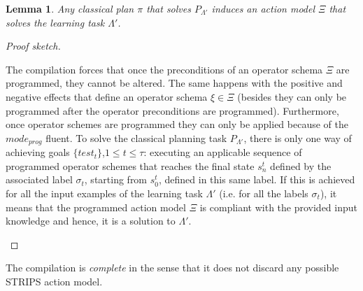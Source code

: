 \documentclass[letterpaper]{article} %
\newtheorem{lemma}[theorem]{Lemma}
\begin{document}
\begin{lemma}
Any classical plan $\pi$ that solves $P_{\Lambda'}$ induces an action model $\Xi$ that solves the learning task $\Lambda'$.
\end{lemma}

\begin{proof}[Proof sketch]
\begin{small}
The compilation forces that once the preconditions of an operator schema $\Xi$ are programmed, they cannot be altered. The same happens with the positive and negative effects that define an operator schema $\xi \in \Xi$ (besides they can only be programmed after the operator preconditions are programmed). Furthermore, once operator schemes are programmed they can only be applied because of the $mode_{prog}$ fluent. To solve the classical planning task $P_{\Lambda'}$, there is only one way of achieving goals $\{test_t\}$,{\small $1\leq t\leq \tau$}: executing an applicable sequence of programmed operator schemes that reaches the final state $s_n^t$ defined by the associated label $\sigma_t$, starting from $s_0^t$, defined in this same label. If this is achieved for all the input examples of the learning task $\Lambda'$ (i.e. for all the labels $\sigma_t$), it means that the programmed action model $\Xi$ is compliant with the provided input knowledge and hence, it is a solution to $\Lambda'$.
\end{small}
\end{proof}

The compilation is {\em complete} in the sense that it does not discard any possible STRIPS action model.
\end{document}

